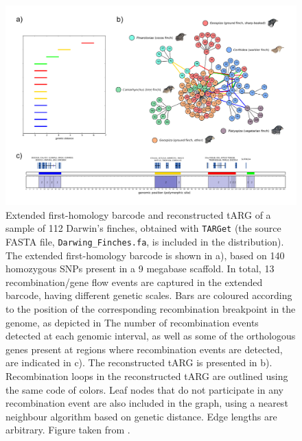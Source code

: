 \documentclass[12pt]{article}
\begin{document}
\begin{figure}[!ht]
\centering
\includegraphics[width=16cm, angle=0]{finches.png}
\caption{Extended first-homology barcode and reconstructed tARG of a sample of 112 Darwin's finches, obtained with \texttt{TARGet} (the source FASTA file, \texttt{Darwing\_Finches.fa}, is included in the distribution). The extended first-homology barcode is shown in a), based on 140 homozygous SNPs present in a 9 megabase scaffold. In total, 13 recombination/gene flow events are captured in the extended barcode, having different genetic scales. Bars are coloured according to the position of the corresponding recombination breakpoint in the genome, as depicted in The number of recombination events detected at each genomic interval, as well as some of the orthologous genes present at regions where recombination events are detected, are indicated in c). The reconstructed tARG is presented in b). Recombination loops in the reconstructed tARG are outlined using the same code of colors. Leaf nodes that do not participate in any recombination event are also included in the graph, using a nearest neighbour algorithm based on genetic distance. Edge lengths are arbitrary. Figure taken from \cite{target}.
\label{fig7}}
\end{figure} 
\end{document}
